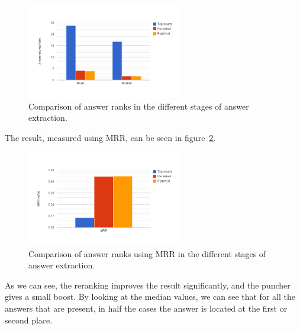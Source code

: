 \begin{figure}[h!]
  \centering
  \hspace*{-0.6cm}
  \includegraphics[width=0.6\textwidth]{figures/meanMedian.png}
  \caption{Comparison of answer ranks in the different stages of answer extraction.}
  \label{fig:meanmedian}
\end{figure}

The result, measured using MRR, can be seen in figure~\ref{fig:mrr}.
\begin{figure}[h!]
  \centering
  \hspace*{-0.6cm}
  \includegraphics[width=0.6\textwidth]{figures/mrr.png}
  \caption{Comparison of answer ranks using MRR in the different stages of answer extraction.}
  \label{fig:mrr}
\end{figure}

As we can see, the reranking improves the result significantly, and the puncher gives a small boost.
By looking at the median values, we can see that for all the answers that are present, 
in half the cases the answer is located at the first or second place.
